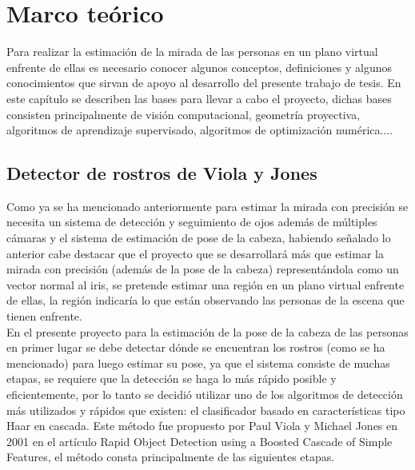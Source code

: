 \chapter{Marco teórico}

	Para realizar la estimación de la mirada de las personas en un plano virtual enfrente de ellas es necesario conocer algunos conceptos, definiciones y algunos conocimientos que sirvan de apoyo al desarrollo del presente trabajo de tesis. En este capítulo se describen las bases para llevar a cabo el proyecto, dichas bases consisten principalmente de visión computacional, geometría proyectiva, algoritmos de aprendizaje supervisado, algoritmos de optimización numérica....


   
   \section{Detector de rostros de Viola y Jones}
  Como ya se ha mencionado anteriormente para estimar la mirada con precisión se necesita un sistema de detección y seguimiento de ojos además de múltiples cámaras y el sistema de estimación de pose de la cabeza, habiendo señalado lo anterior cabe destacar que el proyecto que se desarrollará más que estimar la mirada con precisión (además de la pose de la cabeza) representándola como un vector normal al iris,  se pretende estimar una región en un plano virtual enfrente de ellas, la región indicaría lo que están observando las personas de la escena que tienen enfrente. \\
   
   En el presente proyecto para la estimación de la pose de la cabeza de las personas en primer lugar se debe detectar dónde se encuentran los rostros (como se ha mencionado) para luego estimar su pose, ya que el sistema consiste de muchas etapas, se requiere que la detección se haga lo más rápido posible y eficientemente,  por lo tanto se decidió utilizar uno de los algoritmos de detección más utilizados y rápidos que existen: el clasificador basado en características tipo Haar en cascada. Este método fue propuesto por Paul Viola y Michael Jones en 2001 en el artículo Rapid Object Detection using a Boosted Cascade of Simple Features, el método consta principalmente de las siguientes etapas.
   
